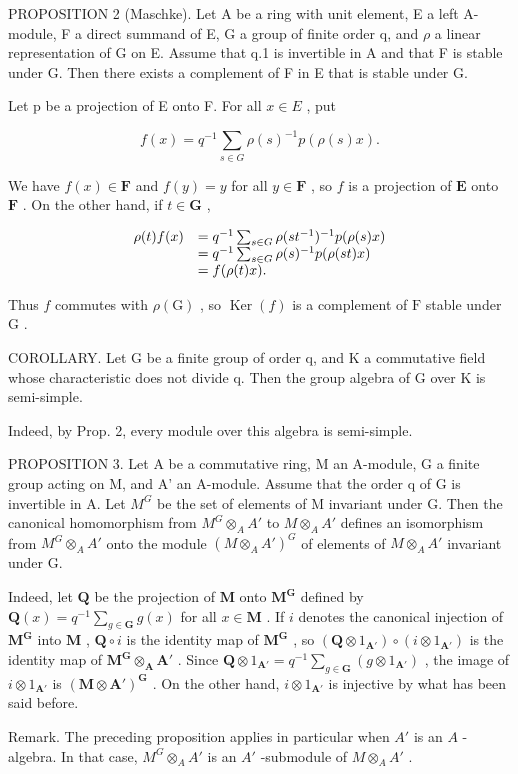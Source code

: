 PROPOSITION 2 (Maschke). Let A be a ring with unit element, E a left A-module, F a direct summand of E, G a group of finite order q, and \(\rho\) a linear representation of G on E. Assume that q.1 is invertible in A and that F is stable under G. Then there exists a complement of F in E that is stable under G.

Let p be a projection of E onto F. For all \(x \in E\) , put

\[
f (x) = q ^ {- 1} \sum_ {s \in G} \rho (s) ^ {- 1} p (\rho (s) x).
\]

We have \(f(x) \in \mathbf{F}\) and \(f(y) = y\) for all \(y \in \mathbf{F}\) , so \(f\) is a projection of \(\mathbf{E}\) onto \(\mathbf{F}\) . On the other hand, if \(t \in \mathbf{G}\) ,

\[
\begin{array}{r l} \rho (t) f (x) & = q ^ {- 1} \sum_ {s \in G} \rho (s t ^ {- 1}) ^ {- 1} p (\rho (s) x) \\ & = q ^ {- 1} \sum_ {s \in G} \rho (s) ^ {- 1} p (\rho (s t) x) \\ & = f (\rho (t) x). \end{array}
\]

Thus \(f\) commutes with \(\rho(\mathrm{G})\) , so \(\operatorname{Ker}(f)\) is a complement of \(\mathrm{F}\) stable under \(\mathrm{G}\) .

COROLLARY. Let G be a finite group of order q, and K a commutative field whose characteristic does not divide q. Then the group algebra of G over K is semi-simple.

Indeed, by Prop. 2, every module over this algebra is semi-simple.

PROPOSITION 3. Let A be a commutative ring, M an A-module, G a finite group acting on M, and A' an A-module. Assume that the order q of G is invertible in A. Let \(M^{G}\) be the set of elements of M invariant under G. Then the canonical homomorphism from \(M^{G} \otimes_{A} A'\) to \(M \otimes_{A} A'\) defines an isomorphism from \(M^{G} \otimes_{A} A'\) onto the module \((M \otimes_{A} A')^{G}\) of elements of \(M \otimes_{A} A'\) invariant under G.

Indeed, let \(\mathbf{Q}\) be the projection of \(\mathbf{M}\) onto \(\mathbf{M}^{\mathbf{G}}\) defined by \(\mathbf{Q}(x) = q^{-1}\sum_{g\in \mathbf{G}}g(x)\) for all \(x\in \mathbf{M}\) . If \(i\) denotes the canonical injection of \(\mathbf{M}^{\mathbf{G}}\) into \(\mathbf{M}\) , \(\mathbf{Q}\circ i\) is the identity map of \(\mathbf{M}^{\mathbf{G}}\) , so \((\mathbf{Q}\otimes 1_{\mathbf{A}'})\circ (i\otimes 1_{\mathbf{A}'})\) is the identity map of \(\mathbf{M}^{\mathbf{G}}\otimes_{\mathbf{A}}\mathbf{A}'\) . Since \(\mathbf{Q}\otimes 1_{\mathbf{A}'} = q^{-1}\sum_{g\in \mathbf{G}}(g\otimes 1_{\mathbf{A}'})\) , the image of \(i\otimes 1_{\mathbf{A}'}\) is \((\mathbf{M}\otimes \mathbf{A}')^{\mathbf{G}}\) . On the other hand, \(i\otimes 1_{\mathbf{A}'}\) is injective by what has been said before.

Remark. The preceding proposition applies in particular when \(A'\) is an \(A\) -algebra. In that case, \(M^G \otimes_A A'\) is an \(A'\) -submodule of \(M \otimes_A A'\) .

